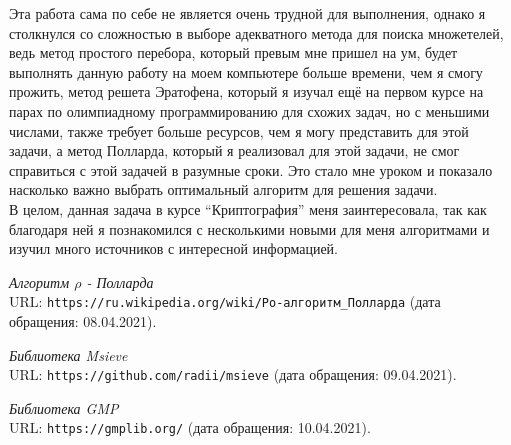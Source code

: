 \documentclass[pdf, unicode, 12pt, a4paper,oneside,fleqn]{article}
\begin{document}
Эта работа сама по себе не является очень трудной для выполнения, однако я столкнулся со сложностью в выборе адекватного метода для поиска множетелей, ведь метод простого перебора, который превым мне пришел на ум, будет выполнять данную работу на моем компьютере больше времени, чем я смогу прожить, метод решета Эратофена, который я изучал ещё на первом курсе на парах по олимпиадному программированию для схожих задач, но с меньшими числами, также требует больше ресурсов, чем я могу представить для этой задачи, а метод Полларда, который я реализовал для этой задачи, не смог справиться с этой задачей в разумные сроки. Это стало мне уроком и показало насколько важно выбрать оптимальный алгоритм для решения задачи.\\

В целом, данная задача в курсе \enquote{Криптография} меня заинтересовала, так как благодаря ней я познакомился с несколькими новыми для меня алгоритмами и изучил много источников с интересной информацией.

\pagebreak

\begin{thebibliography}{99}

{\itshape Алгоритм $\rho$ - Полларда} \\
URL: \texttt{https://ru.wikipedia.org/wiki/Ро-алгоритм\_Полларда} (дата обращения: 08.04.2021).

{\itshape Библиотека Msieve} \\
URL: \texttt{https://github.com/radii/msieve} (дата обращения: 09.04.2021).

{\itshape Библиотека GMP} \\
URL: \texttt{https://gmplib.org/} (дата обращения: 10.04.2021).



\end{thebibliography}
\pagebreak
\end{document}
